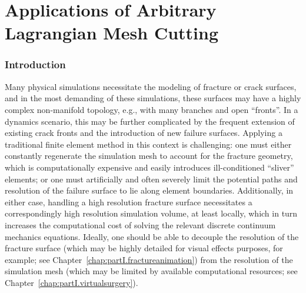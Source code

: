%

\part{Applications of Arbitrary Lagrangian Mesh Cutting}

\renewcommand{\thechapter}{\thepart}

\section*{Introduction}

Many physical simulations necessitate the modeling of fracture or crack surfaces, and in the most demanding of these simulations, these surfaces may have a highly complex non-manifold topology, e.g., with many branches and open ``fronts''. In a dynamics scenario, this may be further complicated by the frequent extension of existing crack fronts and the introduction of new failure surfaces. Applying a traditional finite element method in this context is challenging: one must either constantly regenerate the simulation mesh to account for the fracture geometry, which is computationally expensive and easily introduces ill-conditioned ``sliver'' elements; or one must artificially and often severely limit the potential paths and resolution of the failure surface to lie along element boundaries. Additionally, in either case, handling a high resolution fracture surface necessitates a correspondingly high resolution simulation volume, at least locally, which in turn increases the computational cost of solving the relevant discrete continuum mechanics equations. Ideally, one should be able to decouple the resolution of the fracture surface (which may be highly detailed for visual effects purposes, for example; see Chapter~\ref{chap:partI.fractureanimation}) from the resolution of the simulation mesh (which may be limited by available computational resources; see Chapter~\ref{chap:partI.virtualsurgery}).

